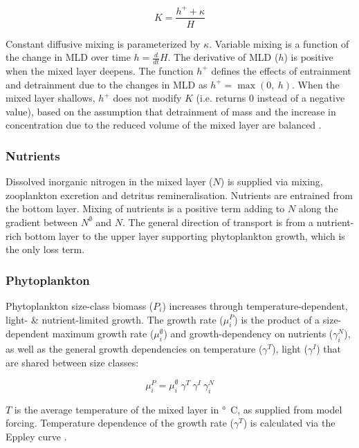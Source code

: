 \documentclass[template.tex]{subfiles}
\begin{document}
\begin{equation}
    K = \frac{h^{+} + \kappa}{H}
\end{equation}

Constant diffusive mixing is parameterized by $\kappa$. Variable mixing is a function of the change in MLD over time $h = \frac{d}{d t} H$. The derivative of MLD ($h$) is positive when the mixed layer deepens. The function $h^{+}$ defines the effects of entrainment and detrainment due to the changes in MLD as $h^{+} = \max(0, \ h)$. When the mixed layer shallows, $h^{+}$ does not modify $K$ (i.e. returns 0 instead of a negative value), based on the assumption that detrainment of mass and the increase in concentration due to the reduced volume of the mixed layer are balanced \citep{Evans1985ACycles}. \\


\subsubsection{Nutrients}
Dissolved inorganic nitrogen in the mixed layer ($N$) is supplied via mixing, zooplankton excretion and detritus remineralisation.
Nutrients are entrained from the bottom layer. Mixing of nutrients is a positive term adding to $N$ along the gradient between $N^\emptyset$ and $N$. The general direction of transport is from a nutrient-rich bottom layer to the upper layer supporting phytoplankton growth, which is the only loss term.


\subsubsection{Phytoplankton}
Phytoplankton size-class biomass ($P_i$) increases through temperature-dependent, light- \& nutrient-limited growth. The growth rate ($\mu_i^{P}$) is the product of a size-dependent maximum growth rate ($\mu_i^{\emptyset}$) and growth-dependency on nutrients ($\gamma_i^{N}$), as well as the general growth dependencies  on temperature ($\gamma^{T}$), light ($\gamma^{I}$) that are shared between size classes: 

\begin{equation}
    \mu_i^{P} = \mu_i^{\emptyset} \ \gamma^{T} \ \gamma^{I} \ \gamma_i^{N}
\end{equation}

$T$ is the average temperature of the mixed layer in \unit{\degree C}, as supplied from model forcing. Temperature dependence of the growth rate ($\gamma^{T}$) is calculated via the Eppley curve \citep{Eppley1972TemperatureSea}.
\end{document}
